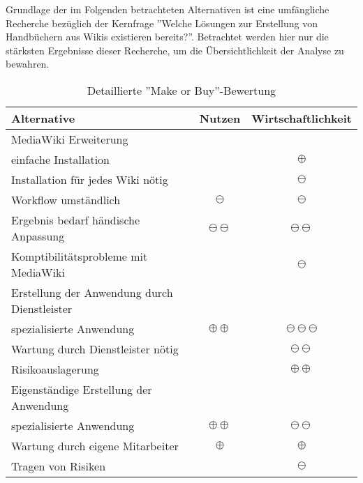 \label{app:make_or_buy}

Grundlage der im Folgenden betrachteten Alternativen ist eine umfängliche Recherche bezüglich der Kernfrage
''Welche Lösungen zur Erstellung von Handbüchern aus Wikis existieren bereits?''.
Betrachtet werden hier nur die stärksten Ergebnisse dieser Recherche, um die Übersichtlichkeit der Analyse zu bewahren.

\begin{table}[H]
	\centering
	\begin{tabular}{lcc}

		\rowcolor{white!15}				
		\textbf{Alternative} & \textbf{Nutzen} & \textbf{Wirtschaftlichkeit} \\\hline		
		
		\rowcolor{MidnightBlue!15}
		MediaWiki Erweiterung 								& 					& 							\\\hline
		\hspace{1.5em} einfache Installation 				&					& $\oplus$  				\\
		\hspace{1.5em} Installation für jedes Wiki nötig 	&					& $\ominus$ 				\\
		\hspace{1.5em} Workflow umständlich 				& $\ominus$ 		& $\ominus$ 				\\
		\hspace{1.5em} Ergebnis bedarf händische Anpassung	& $\ominus\ominus$	& $\ominus\ominus$ 			\\
		\hspace{1.5em} Komptibilitätsprobleme mit MediaWiki	&  					& $\ominus$ 				\\
		
		\rowcolor{MidnightBlue!15}
		Erstellung der Anwendung durch Dienstleister 		& 					& 							\\\hline
		\hspace{1.5em} spezialisierte Anwendung 			& $\oplus\oplus$	& $\ominus\ominus\ominus$	\\
		\hspace{1.5em} Wartung durch Dienstleister nötig 	&					& $\ominus\ominus$ 			\\
		\hspace{1.5em} Risikoauslagerung 					&  					& $\oplus\oplus$ 			\\
		
		\rowcolor{MidnightBlue!15}
		Eigenständige Erstellung der Anwendung 				& 					& 							\\\hline
		\hspace{1.5em} spezialisierte Anwendung 			& $\oplus\oplus$	& $\ominus\ominus$ 			\\
		\hspace{1.5em} Wartung durch eigene Mitarbeiter  	& $\oplus$			& $\oplus$ 					\\
		\hspace{1.5em} Tragen von Risiken 					&  					& $\ominus$ 				\\									
			    
	\end{tabular}
	
	\caption{Detaillierte ''Make or Buy''-Bewertung}
	\label{tab:make_or_buy_detail}
\end{table}		